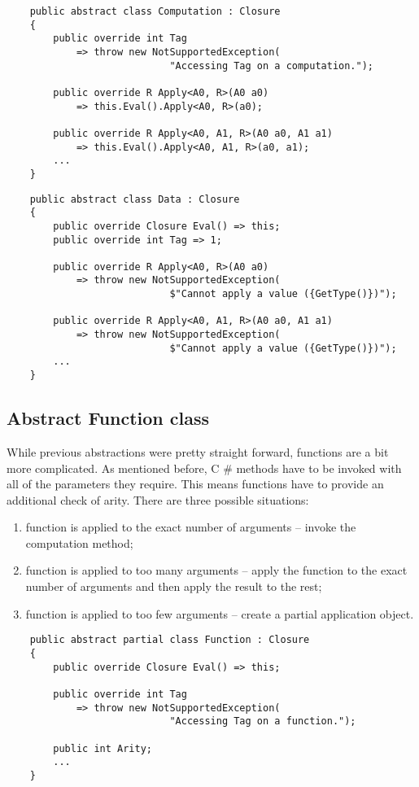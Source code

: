 \documentclass[en]{pracamgr}
\newcommand{\shrp}{%
  {\fontfamily{ppl}\selectfont\#%
  }}
\begin{document}
\begin{verbatim}
    public abstract class Computation : Closure
    {
        public override int Tag
            => throw new NotSupportedException(
                            "Accessing Tag on a computation.");

        public override R Apply<A0, R>(A0 a0)
            => this.Eval().Apply<A0, R>(a0);

        public override R Apply<A0, A1, R>(A0 a0, A1 a1)
            => this.Eval().Apply<A0, A1, R>(a0, a1);
        ...
    }
\end{verbatim}
\begin{verbatim}
    public abstract class Data : Closure
    {
        public override Closure Eval() => this;
        public override int Tag => 1;

        public override R Apply<A0, R>(A0 a0)
            => throw new NotSupportedException(
                            $"Cannot apply a value ({GetType()})");

        public override R Apply<A0, A1, R>(A0 a0, A1 a1)
            => throw new NotSupportedException(
                            $"Cannot apply a value ({GetType()})");
        ...
    }
\end{verbatim}

\subsection{Abstract Function class}\label{s:function_class}

While previous abstractions were pretty straight forward,
functions are a bit more complicated. As mentioned before,
C\shrp{} methods have to be invoked with all of the
parameters they require.
This means functions have to provide an additional check of arity.
There are three possible situations:

\begin{enumerate}
    \item function is applied to the exact number of arguments
    -- invoke the computation method;
    \item function is applied to too many arguments
    -- apply the function to the exact number of arguments
    and then apply the result to the rest;
    \item function is applied to too few arguments 
    -- create a partial application object.
\end{enumerate}

\begin{verbatim}
    public abstract partial class Function : Closure
    {
        public override Closure Eval() => this;

        public override int Tag
            => throw new NotSupportedException(
                            "Accessing Tag on a function.");
        
        public int Arity;
        ...
    }
\end{verbatim}
\end{document}
